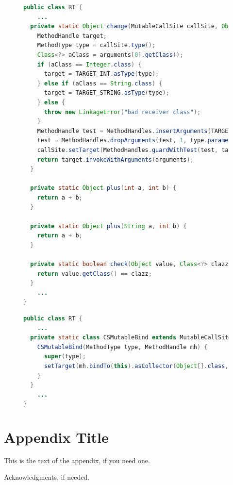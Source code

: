 \documentclass{sigplanconf}
\begin{document}
\begin{figure}
  \begin{lstlisting}[language=Java]
public class RT {
    ...
  private static Object change(MutableCallSite callSite, Object[] arguments) throws Throwable {
    MethodHandle target;
    MethodType type = callSite.type();
    Class<?> aClass = arguments[0].getClass();
    if (aClass == Integer.class) {
      target = TARGET_INT.asType(type);
    } else if (aClass == String.class) {
      target = TARGET_STRING.asType(type);
    } else {
      throw new LinkageError("bad receiver class");
    }
    MethodHandle test = MethodHandles.insertArguments(TARGET_CHECK, 1, aClass);
    test = MethodHandles.dropArguments(test, 1, type.parameterType(1));
    callSite.setTarget(MethodHandles.guardWithTest(test, target, callSite.getTarget()));
    return target.invokeWithArguments(arguments);
  }

  private static Object plus(int a, int b) {
    return a + b;
  }

  private static Object plus(String a, int b) {
    return a + b;
  }

  private static boolean check(Object value, Class<?> clazz) {
    return value.getClass() == clazz;
  }
    ...
}
  \end{lstlisting}
  \caption{}
\end{figure}

\begin{figure}
  \begin{lstlisting}[language=Java]
public class RT {
    ...
  private static class CSMutableBind extends MutableCallSite {
    CSMutableBind(MethodType type, MethodHandle mh) {
      super(type);
      setTarget(mh.bindTo(this).asCollector(Object[].class, type.parameterCount()).asType(type));
    }
  }
    ...
}
  \end{lstlisting}
  \caption{}
\end{figure}


\appendix
\section{Appendix Title}

This is the text of the appendix, if you need one.

\acks

Acknowledgments, if needed.


\makeatletter
  \def\@seccntformat#1{Appendix~\csname the#1\endcsname:\quad}
\makeatother
\end{document}
